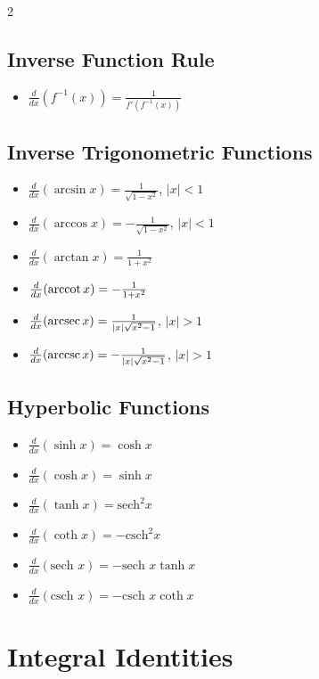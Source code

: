 \begin{multicols}{2}
\subsection*{Inverse Function Rule}
\begin{itemize}
\item $\frac{d}{dx}(f^{-1}(x)) = \frac{1}{f'(f^{-1}(x))}$
\end{itemize}

\subsection*{Inverse Trigonometric Functions}
\begin{itemize}
\item $\frac{d}{dx}(\arcsin x) = \frac{1}{\sqrt{1-x^2}}$, $|x| < 1$
\item $\frac{d}{dx}(\arccos x) = -\frac{1}{\sqrt{1-x^2}}$, $|x| < 1$
\item $\frac{d}{dx}(\arctan x) = \frac{1}{1+x^2}$
\item $\frac{d}{dx}(\arccot x) = -\frac{1}{1+x^2}$
\item $\frac{d}{dx}(\arcsec x) = \frac{1}{|x|\sqrt{x^2-1}}$, $|x| > 1$
\item $\frac{d}{dx}(\arccsc x) = -\frac{1}{|x|\sqrt{x^2-1}}$, $|x| > 1$
\end{itemize}

\subsection*{Hyperbolic Functions}
\begin{itemize}
\item $\frac{d}{dx}(\sinh x) = \cosh x$
\item $\frac{d}{dx}(\cosh x) = \sinh x$
\item $\frac{d}{dx}(\tanh x) = \text{sech}^2 x$
\item $\frac{d}{dx}(\coth x) = -\text{csch}^2 x$
\item $\frac{d}{dx}(\text{sech } x) = -\text{sech } x \tanh x$
\item $\frac{d}{dx}(\text{csch } x) = -\text{csch } x \coth x$
\end{itemize}

\section*{Integral Identities} 


\end{multicols}

